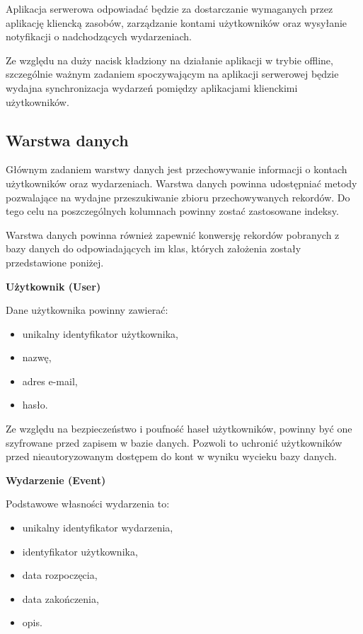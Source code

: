 Aplikacja serwerowa odpowiadać będzie za dostarczanie wymaganych przez aplikację kliencką zasobów, zarządzanie kontami użytkowników oraz wysyłanie notyfikacji o nadchodzących wydarzeniach.

Ze względu na duży nacisk kładziony na działanie aplikacji w trybie offline, szczególnie ważnym zadaniem spoczywającym na aplikacji serwerowej będzie wydajna synchronizacja wydarzeń pomiędzy aplikacjami klienckimi użytkowników.

\subsection{Warstwa danych}
\label{warstwaDanych}

Głównym zadaniem warstwy danych jest przechowywanie informacji o kontach użytkowników oraz wydarzeniach. Warstwa danych powinna udostępniać metody pozwalające na wydajne przeszukiwanie zbioru przechowywanych rekordów. Do tego celu na poszczególnych kolumnach powinny zostać zastosowane indeksy. 

Warstwa danych powinna również zapewnić konwersję rekordów pobranych z bazy danych do odpowiadających im klas, których założenia zostały przedstawione poniżej.

\textbf{Użytkownik (User)}

Dane użytkownika powinny zawierać:

\begin{itemize}
\item unikalny identyfikator użytkownika,
\item nazwę,
\item adres e-mail,
\item hasło.
\end{itemize}

Ze względu na bezpieczeństwo i poufność haseł użytkowników, powinny być one szyfrowane przed zapisem w bazie danych. Pozwoli to uchronić użytkowników przed nieautoryzowanym dostępem do kont w wyniku wycieku bazy danych.

\textbf{Wydarzenie (Event)}

Podstawowe własności wydarzenia to:

\begin{itemize}
\item unikalny identyfikator wydarzenia,
\item identyfikator użytkownika,
\item data rozpoczęcia,
\item data zakończenia,
\item opis.
\end{itemize}

